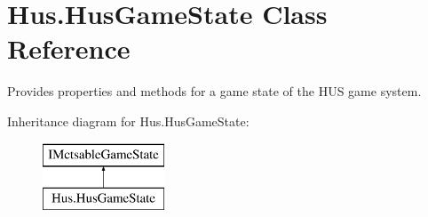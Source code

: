 \hypertarget{class_hus_1_1_hus_game_state}{}\section{Hus.\+Hus\+Game\+State Class Reference}
\label{class_hus_1_1_hus_game_state}


Provides properties and methods for a game state of the H\+US game system.  


Inheritance diagram for Hus.\+Hus\+Game\+State\+:\begin{figure}[H]
\begin{center}
\leavevmode
\includegraphics[height=2.000000cm]{class_hus_1_1_hus_game_state}
\end{center}
\end{figure}
